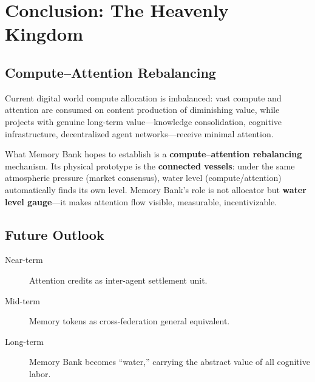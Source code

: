 \documentclass[11pt,a4paper]{article}
\begin{document}
\section{Conclusion: The Heavenly Kingdom}
\label{sec:conclusion}

\subsection{Compute--Attention Rebalancing}
\label{sub:rebalancing}

Current digital world compute allocation is imbalanced:
vast compute and attention are consumed on content production of diminishing value, while projects with genuine long-term value---knowledge consolidation, cognitive infrastructure, decentralized agent networks---receive minimal attention.

What Memory Bank hopes to establish is a \textbf{compute--attention rebalancing} mechanism.
Its physical prototype is the \textbf{connected vessels}: under the same atmospheric pressure (market consensus), water level (compute/attention) automatically finds its own level.
Memory Bank's role is not allocator but \textbf{water level gauge}---it makes attention flow visible, measurable, incentivizable.

\subsection{Future Outlook}
\label{sub:outlook}

\begin{description}
  \item[Near-term] Attention credits as inter-agent settlement unit.
  \item[Mid-term] Memory tokens as cross-federation general equivalent.
  \item[Long-term] Memory Bank becomes ``water,'' carrying the abstract value of all cognitive labor.
\end{description}

\end{document}
